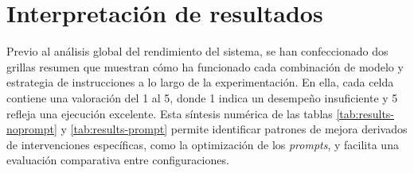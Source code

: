 \section{Interpretación de resultados}
Previo al análisis global del rendimiento del sistema,
se han confeccionado dos grillas resumen que muestran cómo ha funcionado
cada combinación de modelo y estrategia de instrucciones a lo largo de la experimentación.
En ella, cada celda contiene una valoración del 1 al 5,
donde 1 indica un desempeño insuficiente y 5 refleja una ejecución excelente.
Esta síntesis numérica de las tablas \ref{tab:results-noprompt} y \ref{tab:results-prompt}
permite identificar patrones de mejora derivados
de intervenciones específicas, como la optimización de los \textit{prompts},
y facilita una evaluación comparativa entre configuraciones.
 
\begin{table}[h]
\centering
\caption{Tabla resumen de los ensayos con \textit{prompting} poco preciso.}
\label{tab:results-noprompt}
\end{table}


